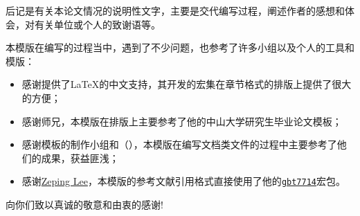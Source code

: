 \begin{acknowledgements}
    后记是有关本论文情况的说明性文字，主要是交代编写过程，阐述作者的感想和体会，对有关单位或个人的致谢语等。

    本模版在编写的过程当中，遇到了不少问题，也参考了许多小组以及个人的工具和模版：
    \begin{itemize}
        \item 感谢\href{https://github.com/CTeX-org/ctex-kit}{}提供了\LaTeX{}的中文支持，其开发的\href{https://ctan.org/tex-archive/language/chinese/ctex}{}宏集在章节格式的排版上提供了很大的方便；
        \item 感谢\href{https://www.zhihu.com/people/sgcd-33}{}师兄，本模版在排版上主要参考了他的中山大学研究生毕业论文模板\href{https://www.overleaf.com/latex/templates/zhong-shan-da-xue-yan-jiu-sheng-bi-ye-lun-wen-mo-ban-sysupalte/kybsnywqbcdc}{}；
        \item 感谢\href{https://github.com/sjtug/SJTUThesis}{}模板的制作小组和\href{https://github.com/nanmu42}{}（\href{https://github.com/nanmu42/CQUThesis}{}），本模版在编写文档类文件的过程中主要参考了他们的成果，获益匪浅；
        \item 感谢\href{https://github.com/zepinglee}{Zeping Lee}，本模版的参考文献引用格式直接使用了他的\href{https://github.com/zepinglee/gbt7714-bibtex-style}{\texttt{gbt7714}}宏包。
    \end{itemize}
    向你们致以真诚的敬意和由衷的感谢!
\end{acknowledgements}
